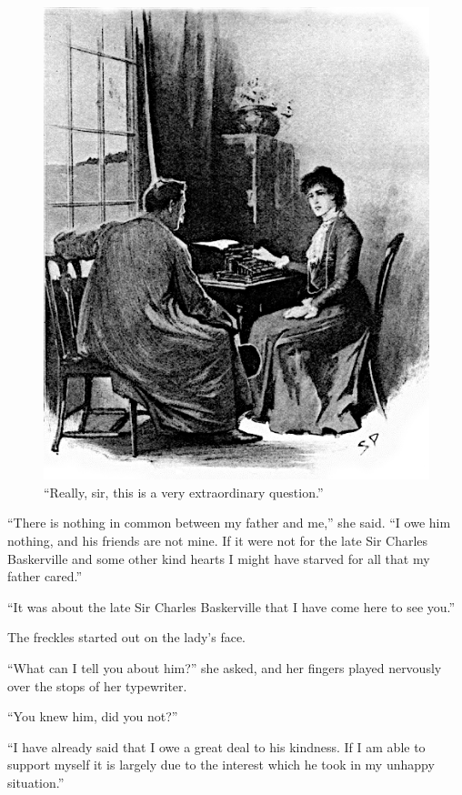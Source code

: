 \documentclass[paper=a5,BCOR=7mm,twoside,DIV=calc,12pt,usegeometry,openany,chapterprefix,endperiod,headings=big]{scrbook} %
\begin{document}
\begin{figure}[tbph]
\centering
\includegraphics[width=\linewidth]{10_extraordinary}
\caption{\enquote{Really, sir, this is a very extraordinary question.}}
\end{figure}

\enquote{There is nothing in common between my father and me,} she said. \enquote{I owe him nothing, and his friends are not mine. If it were not for the late Sir Charles Baskerville and some other kind hearts I might have starved for all that my father cared.}

\enquote{It was about the late Sir Charles Baskerville that I have come here to see you.}

The freckles started out on the lady's face.

\enquote{What can I tell you about him?} she asked, and her fingers played nervously over the stops of her typewriter.

\enquote{You knew him, did you not?}

\enquote{I have already said that I owe a great deal to his kindness. If I am able to support myself it is largely due to the interest which he took in my unhappy situation.}
\end{document}
